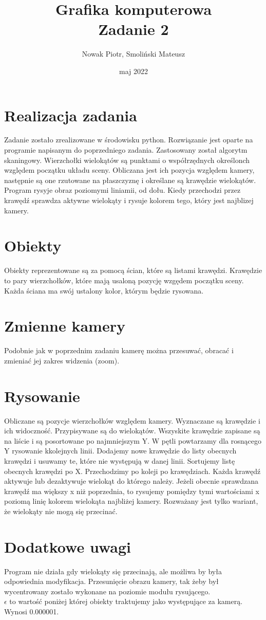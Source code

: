 \documentclass[a4paper,11pt]{article}
\title{Grafika komputerowa \\
{Zadanie 2}}
\author{Nowak Piotr, Smoliński Mateusz}
\date{maj 2022}
\begin{document}
\maketitle

\section{Realizacja zadania}
Zadanie zostało zrealizowane w środowisku python. Rozwiązanie 
jest oparte na programie napisanym do poprzedniego zadania. 
Zastosowany został algorytm skaningowy. Wierzchołki wielokątów
są punktami o współrzędnych określonch względem początku układu 
sceny. Obliczana jest ich pozycja względem kamery, następnie są 
one rzutowane na płaszczyznę i określane są krawędzie wielokątów. 
Program rysyje obraz poziomymi liniamii, od dołu. Kiedy przechodzi
przez krawędź sprawdza aktywne wielokąty i rysuje kolorem tego, 
który jest najblizej kamery.

\section{Obiekty}
Obiekty reprezentowane są za pomocą ścian, które są listami 
krawędzi. Krawędzie to pary wierzchołków, które mają usaloną 
pozycję wzgędem początku sceny. Każda ściana ma swój ustalony 
kolor, którym będzie rysowana.

\section{Zmienne kamery}
Podobnie jak w poprzednim zadaniu kamerę można przesuwać, 
obracać i zmieniać jej zakres widzenia (zoom).

\section{Rysowanie}
Obliczane są pozycje wierzchołków względem kamery. Wyznaczane są 
krawędzie i ich widoczność. Przypisywane są do wielokątów. 
Wszyskite krawędzie zapisane są na liście i są posortowane po 
najmniejszym Y. W pętli powtarzamy dla rosnącego Y rysowanie 
kkolejnych linii. Dodajemy nowe krawędzie do listy obecnych 
krawędzi i usuwamy te, które nie występują w danej linii. 
Sortujemy listę obecnych krawędzi po X. Przechodzimy po koleji 
po krawędziach. Każda krawędź aktywuje lub dezaktywuje wielokąt 
do którego należy. Jeżeli obecnie sprawdzana krawędź ma większy 
x niż poprzednia, to rysujemy pomiędzy tymi wartościami x poziomą 
linię kolorem wielokąta najbliżej kamery. Rozważany jest tylko 
wariant, że wielokąty nie mogą się przecinać.

\section{Dodatkowe uwagi}
Program nie działa gdy wielokąty się przecinają, ale możliwa by 
była odpowiednia modyfikacja.
Przesunięcie obrazu kamery, tak żeby był wycentrowany zostało 
wykonane na poziomie modułu rysującego. \\
\(\epsilon\) to wartość poniżej której obiekty traktujemy jako 
występujące za kamerą. Wynosi 0.000001. 
\end{document}
